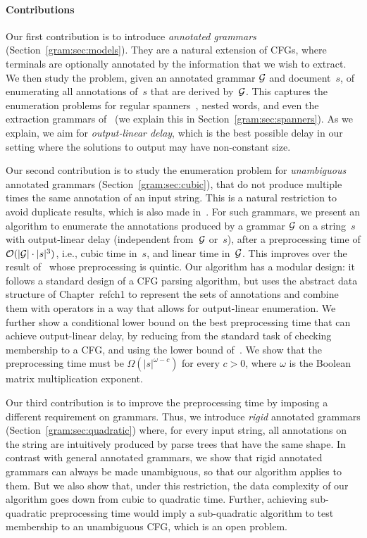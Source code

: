     \paragraph{Contributions}
    Our first contribution is to introduce \emph{annotated grammars} (Section~\ref{gram:sec:models}).
    They are a natural extension of CFGs, where terminals are optionally annotated by the information that we wish to extract.
    We then study the problem, given an annotated grammar $\mathcal{G}$ and document~$s$, of
    enumerating all annotations of~$s$ that are derived by~$\mathcal{G}$.
This captures the enumeration problems for regular spanners~\cite{FlorenzanoRUVV18,amarilli2020constant}, nested words,
and
    even the extraction grammars of~\cite{Peterfreund21} (we explain this in Section~\ref{gram:sec:spanners}). 
    As we explain, we aim for \emph{output-linear delay}, which is the best
    possible delay in our setting where the solutions to output may have
    non-constant size. 

    Our second contribution is to study the enumeration problem for \emph{unambiguous} annotated grammars (Section~\ref{gram:sec:cubic}),
    that do not produce multiple times the same annotation of an input string. This is a natural restriction to avoid duplicate results, %
    which is also made in~\cite{Peterfreund21}. 
  For such grammars, 
%
    we present an algorithm to enumerate the annotations produced by a grammar $\mathcal{G}$ on a string~$s$ with output-linear delay (independent from~$\mathcal{G}$ or~$s$), after a preprocessing time of $\mathcal{O}(|\mathcal{G}| \cdot |s|^3)$, i.e., cubic time in~$s$, and linear time in~$\mathcal{G}$. 
    This improves over the result of~\cite{Peterfreund21} whose preprocessing is quintic. 
    Our algorithm has a modular design: it follows a standard design of a CFG
    parsing algorithm, but uses the abstract data structure
    of Chapter~ref{ch1}
    to represent
    the sets of annotations and combine them with operators in a way that allows for output-linear enumeration. 
    We further show a conditional lower bound on the best preprocessing time that can achieve output-linear delay, by reducing from the standard task of checking membership to a CFG, and using the lower bound of~\cite{AbboudBW18}. We show that the preprocessing time must be $\Omega(|s|^{\omega-c})$ for every $c > 0$, where $\omega$ is
    the Boolean matrix multiplication exponent.

    Our third contribution is to improve the preprocessing time by imposing a different requirement on grammars. Thus, we introduce \emph{rigid} annotated grammars (Section~\ref{gram:sec:quadratic}) where, for every input string, all annotations on the string are intuitively produced by parse trees that have the same shape. In contrast with general annotated grammars, we show that rigid annotated grammars can always be made unambiguous, so that our algorithm applies to them. But we also show that, under this restriction, the data complexity of our algorithm goes down from cubic to quadratic time.
    Further, achieving sub-quadratic preprocessing time would imply a sub-quadratic algorithm to test membership to an unambiguous CFG, which is an open problem.

